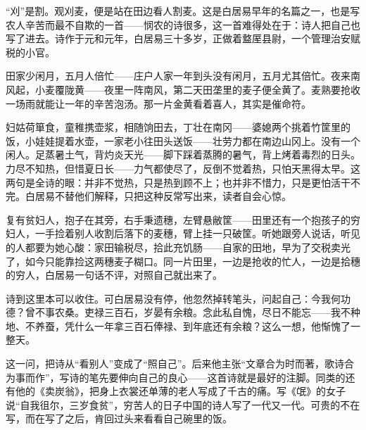 \begin{appreciation}
“刈”是割。观刈麦，便是站在田边看人割麦。这是白居易早年的名篇之一，也是写农人辛苦而最不自欺的一首——悯农的诗很多，这一首难得处在于：诗人把自己也写了进去。诗作于元和元年，白居易三十多岁，正做着盩厔县尉，一个管理治安赋税的小官。

田家少闲月，五月人倍忙——庄户人家一年到头没有闲月，五月尤其倍忙。夜来南风起，小麦覆陇黄——夜里一阵南风，第二天田垄里的麦子便全黄了。麦熟要抢收一场雨就能让一年的辛苦泡汤。那一片金黄看着喜人，其实是催命符。

妇姑荷箪食，童稚携壶浆，相随饷田去，丁壮在南冈——婆媳两个挑着竹筐里的饭，小娃娃提着水壶，一家老小往田头送饭——壮劳力都在南边山冈上。没有一个闲人。足蒸暑土气，背灼炎天光——脚下踩着蒸腾的暑气，背上烤着毒烈的日头。力尽不知热，但惜夏日长——力气都使尽了，反倒不觉着热，只怕天黑得太早。这两句是全诗的眼：并非不觉热，只是热到顾不上；也并非不惜力，只是更怕活干不完。白居易不替他们解释，只把这种反常写出来，读者自会心惊。

复有贫妇人，抱子在其旁，右手秉遗穗，左臂悬敝筐——田里还有一个抱孩子的穷妇人，一手捡着别人收割后落下的麦穗，臂上挂一只破筐。听她跟旁人说话，听见的人都要为她心酸：家田输税尽，拾此充饥肠——自家的田地，早为了交税卖光了，如今只能靠捡这两穗麦子糊口。同一片田里，一边是抢收的忙人，一边是拾穗的穷人，白居易一句话不评，对照自己就出来了。

诗到这里本可以收住。可白居易没有停，他忽然掉转笔头，问起自己：今我何功德？曾不事农桑。吏禄三百石，岁晏有余粮。念此私自愧，尽日不能忘——我不种地、不养蚕，凭什么一年拿三百石俸禄、到年底还有余粮？这么一想，他惭愧了一整天。

这一问，把诗从“看别人”变成了“照自己”。后来他主张“文章合为时而著，歌诗合为事而作”，写诗的笔先要伸向自己的良心——这首诗就是最好的注脚。同类的还有他的《卖炭翁》，把身上衣裳还单薄的老人写成了千古的痛。写《氓》的女子说“自我徂尔，三岁食贫”，穷苦人的日子中国的诗人写了一代又一代。可贵的不在写，而在写了之后，肯回过头来看看自己碗里的饭。
\end{appreciation}

